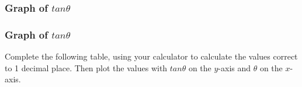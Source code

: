            \subsubsection{ Graph of $tan\theta $}
            \nopagebreak
\label{m39414*secfhsst!!!underscore!!!id2937}
            \subsubsection{  Graph of $tan\theta $ }
            \nopagebreak
             \label{m39414*uid982734}Complete the following table, using your calculator to calculate the values correct to 1 decimal place. Then plot the values with $tan\theta $ on the $y$-axis and $\theta $ on the $x$-axis.\par 

